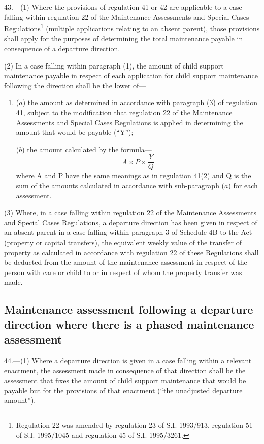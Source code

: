\documentclass[a4paper]{article}
\begin{document}
43.—(1) Where the provisions of regulation 41 or 42 are applicable to
a case falling within regulation 22 of the Maintenance Assessments and Special
Cases Regulations\footnote{\frenchspacing Regulation 22 was amended by regulation 23 of S.I. 1993/913, regulation 51 of S.I. 1995/1045 and regulation 45 of S.I. 1995/3261.} (multiple applications relating to an absent parent),
those provisions shall apply for the purposes of determining the total
maintenance payable in consequence of a departure direction.

(2) In a case falling within paragraph (1), the amount of child support
maintenance payable in respect of each application for child support maintenance
following the direction shall be the lower of—
\begin{enumerate}\item[]
($a$) the amount as determined in accordance with paragraph (3) of regulation 41,
subject to the modification that regulation 22 of the Maintenance Assessments
and Special Cases Regulations is applied in determining the amount that would be
payable (“Y”);

($b$) the amount calculated by the formula—
\[A \times P \times \frac{Y}{Q}\]
where A and P have the same meanings as in regulation 41(2) and Q is the sum of
the amounts calculated in accordance with sub-paragraph ($a$) for each assessment.
\end{enumerate}

(3) Where, in a case falling within regulation 22 of the Maintenance Assessments
and Special Cases Regulations, a departure direction has been given in respect
of an absent parent in a case falling within paragraph 3 of Schedule 4B to the
Act (property or capital transfers), the equivalent weekly value of the transfer
of property as calculated in accordance with regulation 22 of these Regulations
shall be deducted from the amount of the maintenance assessment in respect of
the person with care or child to or in respect of whom the property transfer was
made.

\subsection[44. Maintenance assessment following a departure direction where there is a phased
maintenance assessment]{\sloppy Maintenance assessment following a departure direction where there is a phased
maintenance assessment}

44.—(1) Where a departure direction is given in a case
falling within a relevant enactment, the assessment made in consequence of that
direction shall be the assessment that fixes the amount of child support
maintenance that would be payable but for the provisions of that enactment (“the
unadjusted departure amount”).
\end{document}
